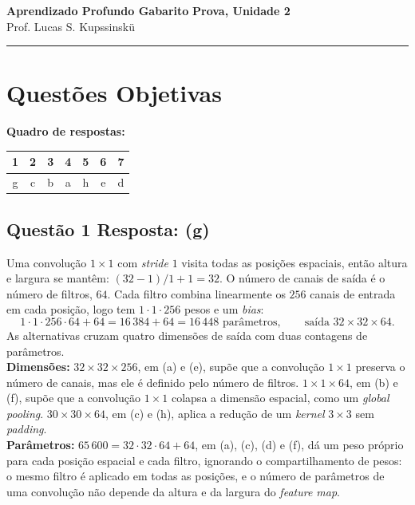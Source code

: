 \documentclass[11pt,a4paper]{article}
\begin{document}
{\Large\bfseries Aprendizado Profundo \textemdash{} Gabarito} \hfill \textbf{Prova, Unidade 2}\\
Prof. Lucas S. Kupssinskü

\rule{\linewidth}{0.8pt}

\section*{Questões Objetivas}

\textbf{Quadro de respostas:}
\begin{center}
\begin{tabular}{|c|c|c|c|c|c|c|}
\hline
1 & 2 & 3 & 4 & 5 & 6 & 7 \\\hline
g & c & b & a & h & e & d \\\hline
\end{tabular}
\end{center}

\color{blue}

\subsection*{Questão 1 \textemdash{} Resposta: (g)}
Uma convolução $1 \times 1$ com \textit{stride} $1$ visita todas as posições espaciais, então altura e largura se mantêm: $(32 - 1)/1 + 1 = 32$. O número de canais de saída é o número de filtros, $64$. Cada filtro combina linearmente os $256$ canais de entrada em cada posição, logo tem $1 \cdot 1 \cdot 256$ pesos e um \textit{bias}:
\[
1 \cdot 1 \cdot 256 \cdot 64 + 64 = 16\,384 + 64 = 16\,448 \text{ parâmetros}, \qquad \text{saída } 32 \times 32 \times 64.
\]
As alternativas cruzam quatro dimensões de saída com duas contagens de parâmetros.\\
\textbf{Dimensões:} $32 \times 32 \times 256$, em (a) e (e), supõe que a convolução $1 \times 1$ preserva o número de canais, mas ele é definido pelo número de filtros. $1 \times 1 \times 64$, em (b) e (f), supõe que a convolução $1 \times 1$ colapsa a dimensão espacial, como um \textit{global pooling}. $30 \times 30 \times 64$, em (c) e (h), aplica a redução de um \textit{kernel} $3 \times 3$ sem \textit{padding}.\\
\textbf{Parâmetros:} $65\,600 = 32 \cdot 32 \cdot 64 + 64$, em (a), (c), (d) e (f), dá um peso próprio para cada posição espacial e cada filtro, ignorando o compartilhamento de pesos: o mesmo filtro é aplicado em todas as posições, e o número de parâmetros de uma convolução não depende da altura e da largura do \textit{feature map}.
\end{document}
